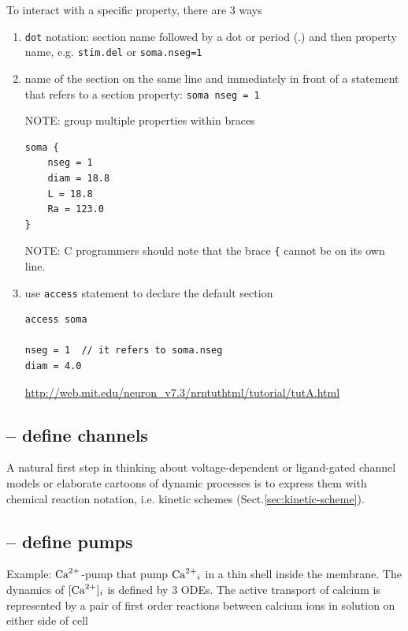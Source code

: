 To interact with a specific property, there are 3 ways
\begin{enumerate}
  \item \verb!dot! notation: section name followed by a dot or period (.)
  and then property name, e.g. \verb!stim.del! or \verb!soma.nseg=1!
  
  \item name of the section on the same line and immediately in front of a
  statement that refers to a section property:
  \verb!soma nseg = 1!
  
NOTE: group multiple properties within braces
\begin{verbatim}
soma {
    nseg = 1
    diam = 18.8
    L = 18.8
    Ra = 123.0
}
\end{verbatim}

NOTE: C programmers should note that the brace \verb!{! cannot be on its own
line.

  \item use \verb!access! statement to declare the default section
\begin{verbatim}
access soma

nseg = 1  // it refers to soma.nseg 
diam = 4.0
\end{verbatim}
\url{http://web.mit.edu/neuron_v7.3/nrntuthtml/tutorial/tutA.html}

\end{enumerate}

\subsection{-- define channels}

A natural first step in thinking about voltage-dependent or ligand-gated channel
models or elaborate cartoons of dynamic processes is to express them with chemical
reaction notation, i.e. kinetic schemes (Sect.\ref{sec:kinetic-scheme}).


\subsection{-- define pumps}

Example: ${\text{Ca}^{2+}}$-pump that pump ${\text{Ca}^{2+}}_i$ in a thin shell inside the membrane. The
dynamics of $[{\text{Ca}^{2+}}]_i$ is defined by 3 ODEs.
The active transport of calcium is represented by a pair of first order reactions
between calcium ions in solution on either side of cell

